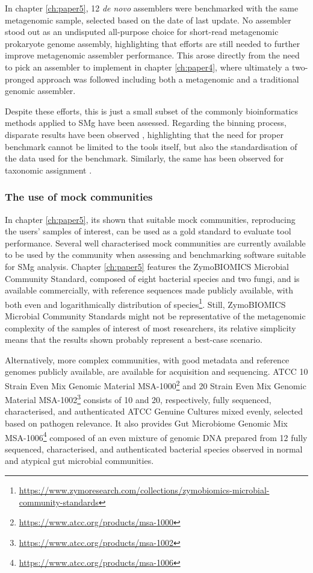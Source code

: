In chapter \ref{ch:paper5}, 12 \textit{de novo} assemblers were benchmarked with the same metagenomic sample, selected based on the date of last update. No assembler stood out as an undisputed all-purpose choice for short-read metagenomic prokaryote genome assembly, highlighting that efforts are still needed to further improve metagenomic assembler performance. This arose directly from the need to pick an assembler to implement in chapter \ref{ch:paper4}, where ultimately a two-pronged approach was followed including both a metagenomic and a traditional genomic assembler. 

Despite these efforts, this is just a small subset of the commonly bioinformatics methods applied to \ac{SMg} have been assessed. Regarding the binning process, disparate results have been observed \citep{bharti_current_2021, yue_evaluating_2020, yang_review_2021, sczyrba_critical_2017}, highlighting that the need for proper benchmark cannot be limited to the tools itself, but also the standardisation of the data used for the benchmark. Similarly, the same has been observed for taxonomic assignment \citep{sczyrba_critical_2017,ye_benchmarking_2019, tamames_assessing_2019}.

\subsubsection{The use of mock communities}

In chapter \ref{ch:paper5}, its shown that suitable mock communities, reproducing the users’ samples of interest, can be used as a gold standard to evaluate tool performance. Several well characterised mock communities are currently available to be used by the community when assessing and benchmarking software suitable for \ac{SMg} analysis. Chapter \ref{ch:paper5} features the ZymoBIOMICS Microbial Community Standard, composed of eight bacterial species and two fungi, and is available commercially, with reference sequences made publicly available, with both even and logarithmically distribution of species\footnote{\url{https://www.zymoresearch.com/collections/zymobiomics-microbial-community-standards}}. Still, ZymoBIOMICS Microbial Community Standards might not be representative of the metagenomic complexity of the samples of interest of most researchers, its relative simplicity means that the results shown probably represent a best-case scenario. 

Alternatively, more complex communities, with good metadata and reference genomes publicly available, are available for acquisition and sequencing. \ac{ATCC} 10 Strain Even Mix Genomic Material
MSA-1000\footnote{\url{https://www.atcc.org/products/msa-1000}} and 20 Strain Even Mix Genomic Material MSA-1002\footnote{\url{https://www.atcc.org/products/msa-1002}} consists of 10 and 20, respectively, fully sequenced, characterised, and authenticated \ac{ATCC} Genuine Cultures mixed evenly, selected based on pathogen relevance. It also provides Gut Microbiome Genomic Mix MSA-1006\footnote{\url{https://www.atcc.org/products/msa-1006}} composed of an even mixture of genomic DNA prepared from 12 fully sequenced, characterised, and authenticated bacterial species observed in normal and atypical gut microbial communities. 


